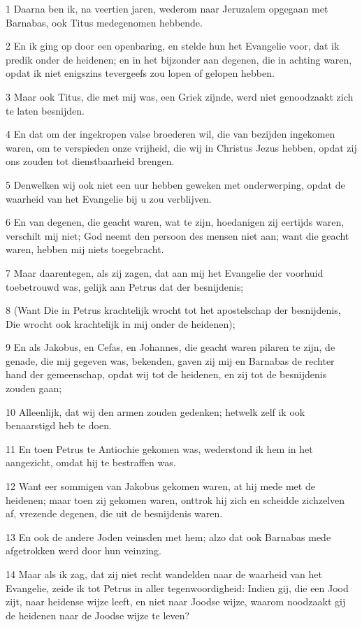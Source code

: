 \par 1 Daarna ben ik, na veertien jaren, wederom naar Jeruzalem opgegaan met Barnabas, ook Titus medegenomen hebbende.
\par 2 En ik ging op door een openbaring, en stelde hun het Evangelie voor, dat ik predik onder de heidenen; en in het bijzonder aan degenen, die in achting waren, opdat ik niet enigszins tevergeefs zou lopen of gelopen hebben.
\par 3 Maar ook Titus, die met mij was, een Griek zijnde, werd niet genoodzaakt zich te laten besnijden.
\par 4 En dat om der ingekropen valse broederen wil, die van bezijden ingekomen waren, om te verspieden onze vrijheid, die wij in Christus Jezus hebben, opdat zij ons zouden tot dienstbaarheid brengen.
\par 5 Denwelken wij ook niet een uur hebben geweken met onderwerping, opdat de waarheid van het Evangelie bij u zou verblijven.
\par 6 En van degenen, die geacht waren, wat te zijn, hoedanigen zij eertijds waren, verschilt mij niet; God neemt den persoon des mensen niet aan; want die geacht waren, hebben mij niets toegebracht.
\par 7 Maar daarentegen, als zij zagen, dat aan mij het Evangelie der voorhuid toebetrouwd was, gelijk aan Petrus dat der besnijdenis;
\par 8 (Want Die in Petrus krachtelijk wrocht tot het apostelschap der besnijdenis, Die wrocht ook krachtelijk in mij onder de heidenen);
\par 9 En als Jakobus, en Cefas, en Johannes, die geacht waren pilaren te zijn, de genade, die mij gegeven was, bekenden, gaven zij mij en Barnabas de rechter hand der gemeenschap, opdat wij tot de heidenen, en zij tot de besnijdenis zouden gaan;
\par 10 Alleenlijk, dat wij den armen zouden gedenken; hetwelk zelf ik ook benaarstigd heb te doen.
\par 11 En toen Petrus te Antiochie gekomen was, wederstond ik hem in het aangezicht, omdat hij te bestraffen was.
\par 12 Want eer sommigen van Jakobus gekomen waren, at hij mede met de heidenen; maar toen zij gekomen waren, onttrok hij zich en scheidde zichzelven af, vrezende degenen, die uit de besnijdenis waren.
\par 13 En ook de andere Joden veinsden met hem; alzo dat ook Barnabas mede afgetrokken werd door hun veinzing.
\par 14 Maar als ik zag, dat zij niet recht wandelden naar de waarheid van het Evangelie, zeide ik tot Petrus in aller tegenwoordigheid: Indien gij, die een Jood zijt, naar heidense wijze leeft, en niet naar Joodse wijze, waarom noodzaakt gij de heidenen naar de Joodse wijze te leven?
